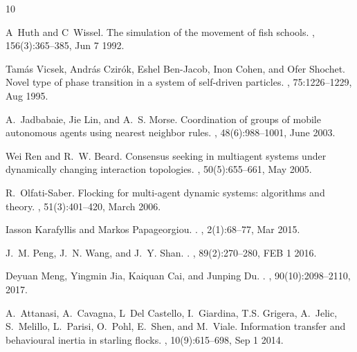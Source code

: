 \documentclass[conference]{IEEEtran}
\begin{document}
\begin{thebibliography}{10}

A~Huth and C~Wissel.
\newblock The simulation of the movement of fish schools.
, 156(3):365--385, Jun 7 1992.

Tam\'as Vicsek, Andr\'as Czir\'ok, Eshel Ben-Jacob, Inon Cohen, and Ofer
  Shochet.
\newblock Novel type of phase transition in a system of self-driven particles.
, 75:1226--1229, Aug 1995.

A.~Jadbabaie, Jie Lin, and A.~S. Morse.
\newblock Coordination of groups of mobile autonomous agents using nearest
  neighbor rules.
, 48(6):988--1001, June
  2003.

Wei Ren and R.~W. Beard.
\newblock Consensus seeking in multiagent systems under dynamically changing
  interaction topologies.
, 50(5):655--661, May
  2005.

R.~Olfati-Saber.
\newblock Flocking for multi-agent dynamic systems: algorithms and theory.
, 51(3):401--420, March
  2006.

Iasson Karafyllis and Markos Papageorgiou.
.
,
  {2}({1}):{68--77}, {Mar} {2015}.

J.~M. Peng, J.~N. Wang, and J.~Y. Shan.
.
, {89}({2}):{270--280}, {FEB
  1} {2016}.

Deyuan Meng, Yingmin Jia, Kaiquan Cai, and Junping Du.
.
, {90}({10}):{2098--2110},
  {2017}.

A.~Attanasi, A.~Cavagna, L~Del Castello, I.~Giardina, T.S. Grigera, A.~Jelic,
  S.~Melillo, L.~Parisi, O.~Pohl, E.~Shen, and M.~Viale.
\newblock Information transfer and behavioural inertia in starling flocks.
, 10(9):615--698, Sep 1 2014.


\end{thebibliography}
\end{document}
